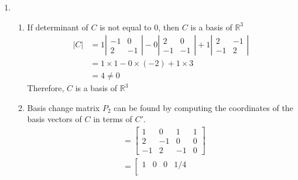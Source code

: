 \documentclass[12pt]{article}
\begin{document}
\begin{enumerate}[label=\alph*.]
                \item 
                    \begin{enumerate}[label=(\roman*)]
                        \item If determinant of $C$ is not equal to 0, then $C$ is a basis of $\mathbb{R}^3$
                            \begin{align*}
                                |C|&=1\left|\begin{matrix}
                                    -1 & 0\\
                                    2 & -1
                                \end{matrix}\right|
                                - 0\left|\begin{matrix}
                                     2 & 0\\
                                    -1 & -1
                                \end{matrix}\right|
                                + 1\left|\begin{matrix}
                                     2 & -1\\
                                    -1 &  2
                                \end{matrix}\right|\\
                                &= 1\times 1 - 0 \times (-2) + 1 \times 3\\
                                &=4 \neq 0
                            \end{align*}
                            Therefore, $C$ is a basis of $\mathbb{R}^3$
                        \item Basis change matrix $P_2$ can be found by computing the coordinates of the basis vectors of $C$ in terms of $C'$.
                            \begin{align*}
                                [C | c'_1] &=
                                \left[\begin{array}{ccc|c}
                                     1 &  0 &  1 & 1\\
                                     2 & -1 &  0 & 0\\
                                    -1 &  2 & -1 & 0
                                \end{array}\right]\\
                                &= \left[\begin{array}{ccc|c}
                                     1 &  0 &  0 & 1/4\\

\end{array}
\end{align*}
\end{enumerate}
\end{enumerate}
\end{document}
